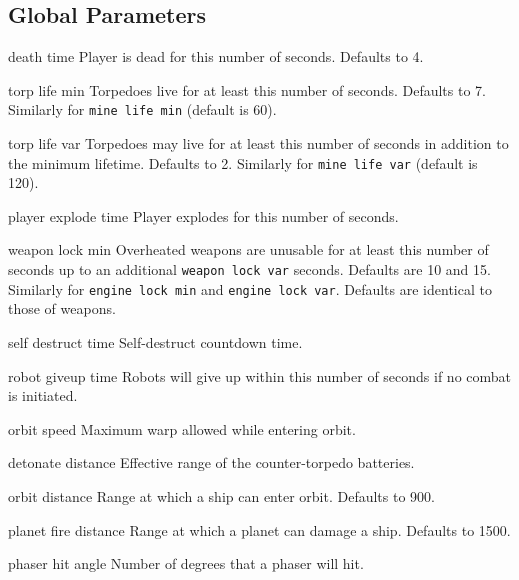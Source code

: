 \subsection{Global Parameters}
\begin{list}{}{
	\renewcommand{\makelabel}[1]{{\tt #1 \hfill}}
         \setlength{\leftmargin}{1.5in} \setlength{\labelwidth}{\leftmargin}
         \setlength{\labelsep}{0in}
         \setlength{\itemsep}{.2em}
}
\item[death time] Player is dead for this number of seconds.  Defaults to 4. 

\item[torp life min]   Torpedoes live for at least this number of seconds.  
Defaults to 7.  Similarly for {\tt mine life min} (default is 60).

\item[torp life var]  Torpedoes may live for at least this number of seconds 
in addition to the minimum lifetime.  Defaults to 2. Similarly for 
{\tt mine life var} (default is 120).

\item[player explode time] Player explodes for this number of seconds.

\item[weapon lock min] Overheated weapons are unusable for at least
this number of seconds  up   to an additional {\tt weapon lock var}
seconds.  Defaults are 10 and 15. Similarly for {\tt engine lock min}
and {\tt engine lock var}.  Defaults are  identical to those of
weapons.

\item[self destruct time]  Self-destruct countdown time.

\item[robot giveup time] Robots will give up within this number of
seconds if no combat is initiated.

\item[orbit speed]   Maximum warp allowed while entering orbit. 

\item[detonate distance]  Effective range of the counter-torpedo batteries. 

\item[orbit distance]  Range at which a ship can enter orbit. Defaults to 900.

\item[planet fire distance]  Range at which a planet can damage a ship.
Defaults to 1500.

\item[phaser hit angle]  Number of degrees that a phaser will hit.


\end{list}

